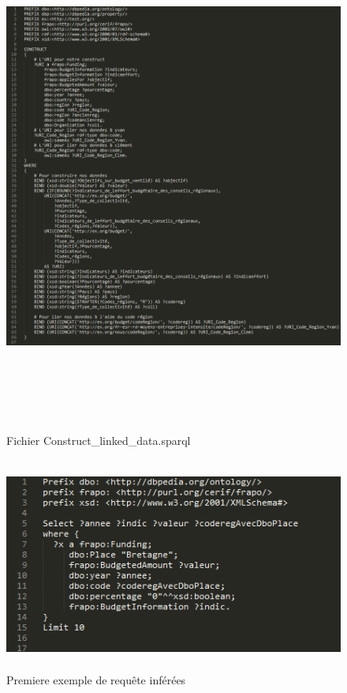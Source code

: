 \documentclass[a4paper,sffamily,12pt]{article}
\begin{document}
		\begin{figure}[!h]
			
			\vspace{0.5cm}	
			\centerline{\includegraphics[height=17cm]{picture/constructv2.png}}
			\caption{Fichier Construct\_linked\_data.sparql}
			\label{constructv2}
			
		\end{figure}		
	
		\newpage		

		\begin{figure}[!h]

			\vspace{0.5cm}			
			\centerline{\includegraphics[height=7cm]{picture/inference1.png}}
			\caption{Premiere exemple de requête inférées}
			\label{inf1}
			
		\end{figure}		
	
\end{document}
